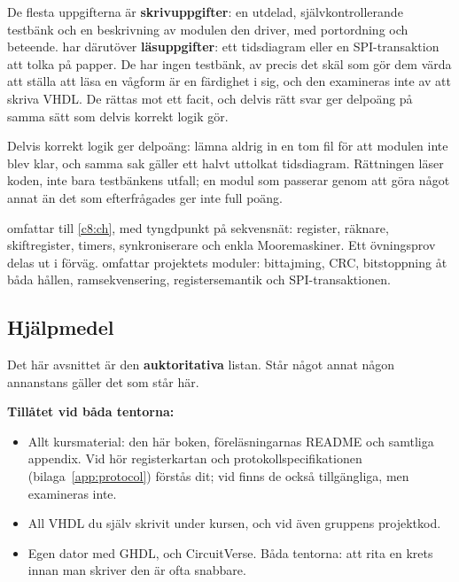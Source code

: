 De flesta uppgifterna är \textbf{skrivuppgifter}: en utdelad, självkontrollerande testbänk och en
beskrivning av modulen den driver, med portordning och beteende.  har därutöver
\textbf{läsuppgifter}: ett tidsdiagram eller en SPI-transaktion att tolka på papper. De har ingen
testbänk, av precis det skäl som gör dem värda att ställa \textemdash{} att läsa en vågform är en
färdighet i sig, och den examineras inte av att skriva VHDL. De rättas mot ett facit, och delvis rätt
svar ger delpoäng på samma sätt som delvis korrekt logik gör.

Delvis korrekt logik ger delpoäng: lämna aldrig in en tom fil för att modulen inte blev klar, och
samma sak gäller ett halvt uttolkat tidsdiagram. Rättningen läser koden, inte bara testbänkens
utfall; en modul som passerar genom att göra något annat än det som efterfrågades ger inte full poäng.

 omfattar  till \ref{c8:ch}, med tyngdpunkt på sekvensnät: register,
räknare, skiftregister, timers, synkroniserare och enkla Mooremaskiner. Ett övningsprov delas ut i
förväg.  omfattar projektets moduler: bittajming, CRC, bitstoppning åt båda hållen,
ramsekvensering, registersemantik och SPI-transaktionen.

\subsection{Hjälpmedel}
\label{app:project:aids}

Det här avsnittet är den \textbf{auktoritativa} listan. Står något annat någon annanstans gäller det
som står här.

\textbf{Tillåtet vid båda tentorna:}
\begin{itemize}
  \item Allt kursmaterial: den här boken, föreläsningarnas README och samtliga appendix. Vid
     hör registerkartan och protokollspecifikationen (bilaga~\ref{app:protocol})
    förstås dit; vid  finns de också tillgängliga, men examineras inte.
  \item All VHDL du själv skrivit under kursen, och vid  även gruppens projektkod.
  \item Egen dator med GHDL, och CircuitVerse. Båda tentorna: att rita en krets innan man skriver
    den är ofta snabbare.
\end{itemize}

